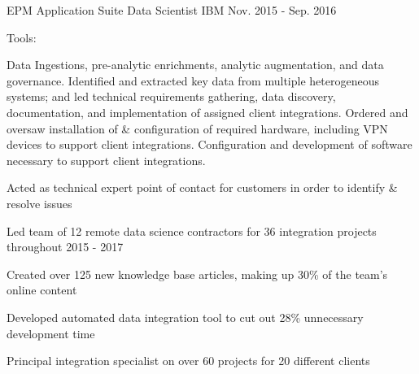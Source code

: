 \begin{cventries}
  \cvexpentry
    {EPM Application Suite} %
    {Data Scientist}
    {IBM}
    {Nov. 2015 - Sep. 2016}
    {
      \begin{cvheavyparagraph}
        Tools:
      \end{cvheavyparagraph}
    }
    {
      \begin{cvparagraph}
        Data Ingestions, pre-analytic enrichments, analytic augmentation, and data governance.  Identified and extracted key data from multiple heterogeneous systems; and led technical requirements gathering, data discovery, documentation, and implementation of assigned client integrations.  Ordered and oversaw installation of \& configuration of required hardware, including VPN devices to support client integrations.  Configuration and development of software necessary to support client integrations.
      \end{cvparagraph}
      \begin{cvitems} %
        \item {Acted as technical expert point of contact for customers in order to identify \& resolve issues}
        \item {Led team of 12 remote data science contractors for 36 integration projects throughout 2015 - 2017}
        \item {Created over 125 new knowledge base articles, making up 30\% of the team's online content}
        \item {Developed automated data integration tool to cut out 28\% unnecessary development time}
        \item {Principal integration specialist on over 60 projects for 20 different clients}
      \end{cvitems}
    }


\end{cventries}
